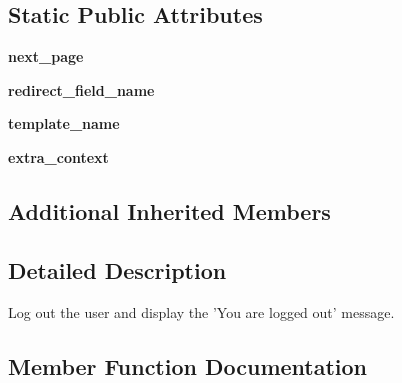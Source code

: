 \subsection*{Static Public Attributes}
\begin{DoxyCompactItemize}
\item 
\mbox{\label{classdjango_1_1contrib_1_1auth_1_1views_1_1_logout_view_ab9e2fb553f22b9b65afa6a8a77055c4e}} 
{\bfseries next\+\_\+page}
\item 
\mbox{\label{classdjango_1_1contrib_1_1auth_1_1views_1_1_logout_view_ae4faaabc07a5da2c3ee996298a6cd539}} 
{\bfseries redirect\+\_\+field\+\_\+name}
\item 
\mbox{\label{classdjango_1_1contrib_1_1auth_1_1views_1_1_logout_view_aaad2cdcc6d7abaddc0426398b1a1faae}} 
{\bfseries template\+\_\+name}
\item 
\mbox{\label{classdjango_1_1contrib_1_1auth_1_1views_1_1_logout_view_a7dc31011abc98bde324038be2518ceab}} 
{\bfseries extra\+\_\+context}
\end{DoxyCompactItemize}
\subsection*{Additional Inherited Members}


\subsection{Detailed Description}
\begin{DoxyVerb}Log out the user and display the 'You are logged out' message.
\end{DoxyVerb}
 

\subsection{Member Function Documentation}
\mbox{\label{classdjango_1_1contrib_1_1auth_1_1views_1_1_logout_view_a5b764772cc3b0056ace2d6132624e107}} 
